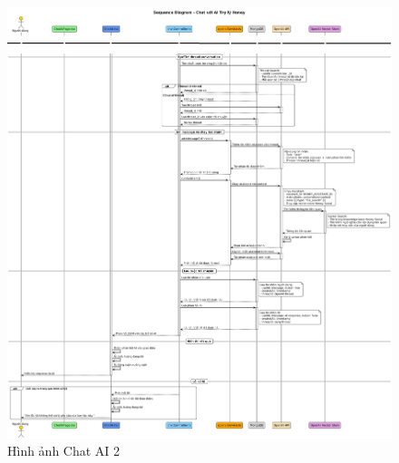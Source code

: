 \begin{figure}[H]
    \centering
    \includegraphics[width=1\textwidth]{image/sequence/chat-ai2.png}
    \caption{Hình ảnh Chat AI 2}
    \label{fig:chat_ai2}
\end{figure}


